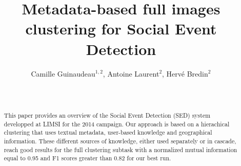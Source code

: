 \documentclass{acm_proc_article-me11_tweaked}
\begin{document}
\title{Metadata-based full images clustering for Social Event Detection}
%
%
%
%
%

%
\author{
Camille Guinaudeau$^{1,2}$, Antoine Laurent$^{2}$, Herv\'{e} Bredin$^{2}$\\
       \\
       \\
}


\maketitle
\begin{abstract}
This paper provides an overview of the Social Event Detection (SED) system developped at LIMSI for the 2014 campaign. Our approach is based on a hierachical clustering that uses textual metadata, user-based knowledge and geographical information. These different sources of knowledge, either used separately or in cascade, reach good results for the full clustering subtask with a normalized mutual information equal to 0.95 and F1 scores greater than 0.82 for our best run.

\end{abstract}
\end{document}
